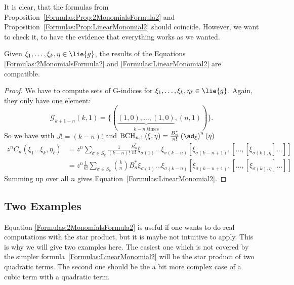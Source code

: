 It is clear, that the formulas from 
Proposition~\ref{Formulas:Prop:2MonomialsFormula2} and 
Proposition~\ref{Formulas:Prop:LinearMonomial2} should coincide. However, 
we want to check it, to have the evidence that everything works as we wanted.
\begin{corollary}
	\label{Formulas:Cor:FormulasCoincide}
	Given $\xi_1, \ldots, \xi_k, \eta \in \lie{g}$, the results of the 
	Equations \eqref{Formulas:2MonomialsFormula2} and 
	\eqref{Formulas:LinearMonomial2} are compatible.
\end{corollary}
\begin{proof}
	We have to compute sets of G-indices for $\xi_1, \ldots, \xi_k, 
	\eta_{\ell} \in \lie{g}$. Again, they only have one element:
	\begin{equation*}
		\mathcal{G}_{k + 1 - n}(k, 1)
		=
		\Big\{
			( 
				\underbrace{(1,0), \ldots, (1,0)}_{
				k - n \text{ times}
				}
				,
				(n,1)
			)
		\Big\}.
	\end{equation*}
	So we have with $J! = (k - n)!$ and $\bchparts{n}{1}{\xi}{\eta} = 
	\frac{B_n^*}{n!} \left( \ad_{\xi} \right)^n (\eta)$
	\begin{align*}
		z^n C_n
		\left(
			\xi_1 \ldots \xi_k, \eta_{\ell}
		\right)
		& =
		z^n
		\sum\limits_{\sigma \in S_k}
		\frac{1}{(k - n)!}
		\frac{B_n^*}{n!}
		\xi_{\sigma(1)} \ldots \xi_{\sigma(k-n)}
		[\xi_{\sigma(k-n+1)}, [
			\ldots, [\xi_{\sigma(k), \eta} ] \ldots 
		]]
		\\
		& =
		z^n
		\frac{1}{k!}
		\sum\limits_{\sigma \in S_k}
		\binom{k}{n} B_n^*
		\xi_{\sigma(1)} \ldots \xi_{\sigma(k-n)}
		[\xi_{\sigma(k-n+1)}, [
			\ldots, [\xi_{\sigma(k), \eta} ] \ldots 
		]]		
	\end{align*}
	Summing up over all $n$ gives Equation~\eqref{Formulas:LinearMonomial2}.
\end{proof}



\subsection{Two Examples}
Equation \eqref{Formulas:2MonomialsFormula2} is useful if one wants to do 
real computations with the star product, but it is maybe not intuitive to 
apply. This is why we will give two examples here. The easiest one which is 
not covered by the simpler formula~\eqref{Formulas:LinearMonomial2} will be 
the star product of two quadratic terms. The second one should be the a bit 
more complex case of a cubic term with a quadratic term.

